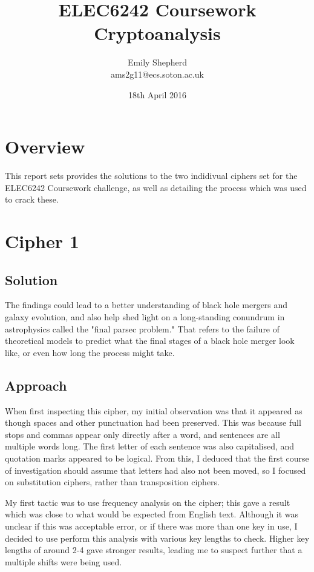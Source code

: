 \documentclass{article}
\title{ELEC6242 Coursework Cryptoanalysis}
\author{Emily Shepherd \\ ams2g11@ecs.soton.ac.uk}
\date{18th April 2016}
\begin{document}
    \maketitle

    \section{Overview}

    This report sets provides the solutions to the two indidivual
    ciphers set for the ELEC6242 Coursework challenge, as well as
    detailing the process which was used to crack these.

    \section{Cipher 1}

    \subsection{Solution}

    \begin{displayquote}
        The findings could lead to a better understanding of black hole
        mergers and galaxy evolution, and also help shed light on a
        long-standing conundrum in astrophysics called the "final
        parsec problem." That refers to the failure of theoretical
        models to predict what the final stages of a black hole merger
        look like, or even how long the process might take.
    \end{displayquote}

    \subsection{Approach}

    When first inspecting this cipher, my initial observation was that
    it appeared as though spaces and other punctuation had been
    preserved. This was because full stops and commas appear only
    directly after a word, and sentences are all multiple words long.
    The first letter of each sentence was also capitalised, and
    quotation marks appeared to be logical. From this, I deduced that
    the first course of investigation should assume that letters had
    also not been moved, so I focused on substitution ciphers, rather
    than transposition ciphers.

    My first tactic was to use frequency analysis on the cipher; this
    gave a result which was close to what would be expected from
    English text. Although it was unclear if this was acceptable error,
    or if there was more than one key in use, I decided to use perform
    this analysis with various key lengths to check. Higher key lengths
    of around 2-4 gave stronger results, leading me to suspect further
    that a multiple shifts were being used.
\end{document}
